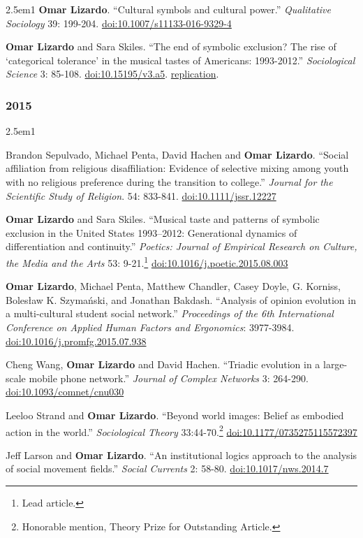 \documentclass[
]{article}
\newenvironment{cventry}{\begin{hangparas}{2.5em}{1}}{\end{hangparas}}
\begin{document}
\begin{cventry}
\textbf{Omar Lizardo}. ``Cultural symbols and cultural power.''
\emph{Qualitative Sociology} 39: 199-204.
\href{https://doi.org/10.1007/s11133-016-9329-4}{doi:10.1007/s11133-016-9329-4}

\textbf{Omar Lizardo} and Sara Skiles. ``The end of symbolic exclusion?
The rise of `categorical tolerance' in the musical tastes of Americans:
1993-2012.'' \emph{Sociological Science} 3: 85-108.
\href{https://doi.org/10.15195/v3.a5}{doi:10.15195/v3.a5}.
\href{https://github.com/olizardo/lizardo-skiles-categorical-tolerance}{
replication}.

\end{cventry}

\subsubsection{2015}\label{section-7}

\begin{cventry}

Brandon Sepulvado, Michael Penta, David Hachen and \textbf{Omar
Lizardo}. ``Social affiliation from religious disaffiliation: Evidence
of selective mixing among youth with no religious preference during the
transition to college.'' \emph{Journal for the Scientific Study of
Religion}. 54: 833-841.
\href{https://doi.org/10.1111/jssr.12227}{doi:10.1111/jssr.12227}

\textbf{Omar Lizardo} and Sara Skiles. ``Musical taste and patterns of
symbolic exclusion in the United States 1993--2012: Generational
dynamics of differentiation and continuity.'' \emph{Poetics: Journal of
Empirical Research on Culture, the Media and the Arts} 53:
9-21.\footnote{Lead article.}
\href{https://doi.org/10.1016/j.poetic.2015.08.003}{doi:10.1016/j.poetic.2015.08.003}

\textbf{Omar Lizardo}, Michael Penta, Matthew Chandler, Casey Doyle, G.
Korniss, Bolesław K. Szymański, and Jonathan Bakdash. ``Analysis of
opinion evolution in a multi-cultural student social network.''
\emph{Proceedings of the 6th International Conference on Applied Human
Factors and Ergonomics}: 3977-3984.
\href{https://doi.org/10.1016/j.promfg.2015.07.938}{doi:10.1016/j.promfg.2015.07.938}

Cheng Wang, \textbf{Omar Lizardo} and David Hachen. ``Triadic evolution
in a large-scale mobile phone network.'' \emph{Journal of Complex
Networks} 3: 264-290.
\href{https://doi.org/10.1093/comnet/cnu030}{doi:10.1093/comnet/cnu030}

Leeloo Strand and \textbf{Omar Lizardo}. ``Beyond world images: Belief
as embodied action in the world.'' \emph{Sociological Theory}
33:44-70.\footnote{Honorable mention, Theory Prize for Outstanding
  Article.}
\href{https://doi.org/10.1177/0735275115572397}{doi:10.1177/0735275115572397}

Jeff Larson and \textbf{Omar Lizardo}. ``An institutional logics
approach to the analysis of social movement fields.'' \emph{Social
Currents} 2: 58-80.
\href{https://doi.org/10.1017/nws.2014.7}{doi:10.1017/nws.2014.7}

\end{cventry}
\end{document}
